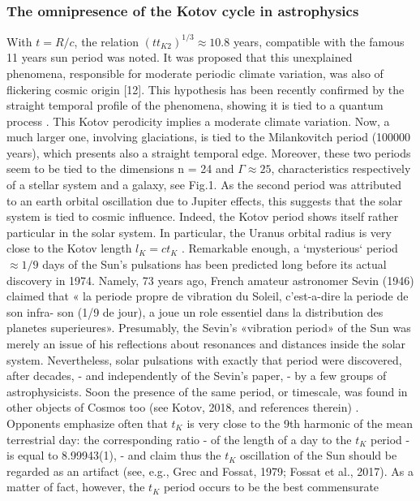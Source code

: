 \documentclass[twoside,draft]{article}
\begin{document}
\begin{sloppypar}
{\subsubsection{The omnipresence of the Kotov cycle in astrophysics}

With $t = R/c$, the relation $(t t_{K2} )^{1/3} \approx 10.8$ years, compatible with the famous 11 years sun period
was noted. It was proposed that this unexplained phenomena, responsible for moderate periodic
climate variation, was also of flickering cosmic origin [12]. This hypothesis has been recently
confirmed by the straight temporal profile of the phenomena, showing it is tied to a quantum
process \cite{Kotov}.
This Kotov perodicity implies a moderate climate variation. Now, a much larger one, involving
glaciations, is tied to the Milankovitch period (100000 years), which presents also a straight
temporal edge. Moreover, these two periods seem to be tied to the dimensions n = 24 and $\Gamma \approx 25$,
characteristics respectively of a stellar system and a galaxy, see Fig.1. As the second period was
attributed to an earth orbital oscillation due to Jupiter effects, this suggests that the solar system is
tied to cosmic influence. Indeed, the Kotov period shows itself rather particular in the solar system.
In particular, the Uranus orbital radius is very close to the Kotov length $l_{K} = ct_{K}$ .
Remarkable enough, a `mysterious` period $\approx 1/9$ days of the Sun's pulsations has been predicted
long before its actual discovery in 1974. Namely, 73 years ago, French amateur astronomer Sevin
(1946) claimed that « la periode propre de vibration du Soleil, c'est-a-dire la periode de son infra-
son (1/9 de jour), a joue un role essentiel dans la distribution des planetes superieures». Presumably,
the Sevin's «vibration period» of the Sun was merely an issue of his reflections about resonances
and distances inside the solar system. Nevertheless, solar pulsations with exactly that period were
discovered, after decades, - and independently of the Sevin's paper, - by a few groups of
astrophysicists. Soon the presence of the same period, or timescale, was found in other objects of
Cosmos too (see Kotov, 2018, and references therein) .
Opponents emphasize often that $t_{K}$ is very close to the 9th harmonic of the mean terrestrial day: the corresponding ratio - of the length of a day to the $t_{K}$ period - is equal to 8.99943(1), - and claim
thus the $t_{K}$ oscillation of the Sun should be regarded as an artifact (see, e.g., Grec and Fossat, 1979;
Fossat et al., 2017). As a matter of fact, however, the $t_{K}$ period occurs to be the best commensurate
}
\end{sloppypar}
\end{document}

